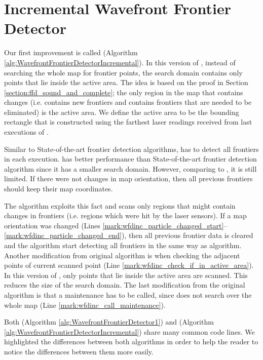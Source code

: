 \section{Incremental Wavefront Frontier Detector}
\label{section:wfd_incremental}
Our first \WFD improvement is called \WFDINC (Algorithm
\ref{alg:WavefrontFrontierDetectorIncremental}). In this version of \WFD,
instead of searching the whole map for frontier points, the search domain
contains only points that lie inside the active area. The idea is based on
the proof in Section \ref{section:ffd_sound_and_complete}; the only region in
the map that contains changes (i.e. contains new frontiers and contains
frontiers that are needed to be eliminated) is the active area. We define the
active area to be the bounding rectangle that is constructed using the farthest
laser readings received from last executions of \WFDINC.


 
Similar to State-of-the-art frontier detection algorithms, \WFD
has to detect all frontiers in each execution. \WFD has better performance
than State-of-the-art frontier detection algorithm since it has a smaller search
domain. However, comparing to \FFD, it is still limited. If there were
not changes in map orientation, then all previous frontiers should keep their
map coordinates. 

The \WFDINC algorithm exploits this fact and scans only regions
that might contain changes in frontiers (i.e. regions which were hit by the
laser sensors). If a map orientation was changed (Lines
\ref{mark:wfdinc_particle_changed_start}--\ref{mark:wfdinc_particle_changed_end}),
then all previous frontier data is cleared and the
algorithm start detecting all frontiers in the same way as \WFD algorithm.
Another modification from original \WFD algorithm is when checking the adjacent
points of current scanned point (Line
\ref{mark:wfdinc_check_if_in_active_area}). In this version of \WFD, only points
that lie inside the active area are scanned. This reduces the size of the search
domain. The last modification from the original \WFD algorithm is that a
maintenance has to be called, since \WFDINC does not search over the whole map
(Line \ref{mark:wfdinc_call_maintenance}).     

Both \WFD (Algorithm \ref{alg:WavefrontFrontierDetector1}) and \WFDINC
(Algorithm \ref{alg:WavefrontFrontierDetectorIncremental}) share many common code lines.
We highlighted the differences between both algorithms in order to help the reader
to notice the differences between them more easily.
%



